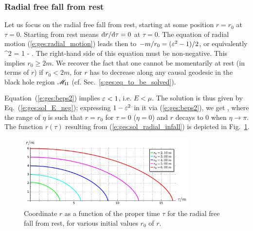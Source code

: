 \subsubsection{Radial free fall from rest}

Let us focus on the radial free fall from rest, starting at some
position $r=r_0$ at $\tau=0$. Starting from rest
means $\mathrm{d} r/\mathrm{d}\tau = 0$ at $\tau=0$. The equation of radial motion
(\ref{e:ges:radial_motion}) leads then to $-m/r_0 = (\varepsilon^2 - 1)/2$,
or equivalently
\be \label{e:ges:beps2}
         \veps^2 = 1 -  .
\ee
The right-hand side of this equation must be non-negative. This implies
$r_0\geq 2m$. We recover the fact that one cannot be momentarily at rest
(in terms of $r$) if $r_0<2m$, for $r$ has to decrease along any causal
geodesic in the black hole region $\mathscr{M}_{\rm II}$
(cf. Sec.~\ref{s:ges:eq_to_be_solved}).

Equation~(\ref{e:ges:beps2}) implies $\varepsilon < 1$, i.e. $E < \mu$. The solution
is thus given by Eq.~(\ref{e:ges:sol_E_neg}); expressing $1-\varepsilon^2$
in it via (\ref{e:ges:beps2}), we get
\be \label{e:ges:sol_radial_infall}
     \leq \eta \leq \pi ,
\ee
where the range of $\eta$ is such that $r=r_0$ for $\tau=0$ ($\eta=0$) and
$r$ decays to $0$ when $\eta\to \pi$. The function $r(\tau)$ resulting
from (\ref{e:ges:sol_radial_infall}) is depicted in
Fig.~\ref{f:ges:radial_infall_tau}.

\begin{figure}
\centerline{\includegraphics[width=0.8\textwidth]{ges_radial_infall_tau.pdf}}
\caption[]{\label{f:ges:radial_infall_tau} \footnotesize
Coordinate $r$ as a function of the proper time $\tau$
for the radial free fall from rest, for various initial values $r_0$ of $r$.}
\end{figure}


